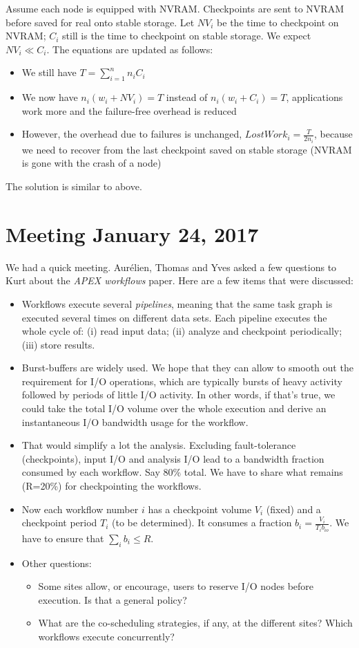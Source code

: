 \documentclass{article}
\begin{document}
Assume each node is equipped with NVRAM. Checkpoints are sent to NVRAM before
saved for real onto stable storage. Let $NV_{i}$ be the time to checkpoint on NVRAM; $C_{i}$
still is the time to checkpoint on stable storage. We expect $NV_{i} \ll C_{i}$.
The equations are updated as follows:
\begin{itemize}
\item We still have $T  = \sum_{i=1}^{n} n_{i} C_{i}$
\item  We now have $n_{i} (w_{i}+NV_{i})=T$ instead of $n_{i} (w_{i}+C_{i})=T$, applications work more and the failure-free overhead is reduced
\item However, the overhead due to failures is unchanged, $LostWork_{i} = \frac{T}{2n_{i}}$, 
because we need to recover from the last checkpoint saved on stable storage (NVRAM is gone with the crash of a node)
\end{itemize}
The solution is similar to above.

\clearpage
\section{Meeting January 24, 2017}

We had a quick meeting. Aurélien, Thomas and Yves asked a few questions to Kurt 
about the \emph{APEX workflows} paper. Here are a few items that were discussed:
\begin{itemize}
\item Workflows execute several \emph{pipelines}, meaning that the same task graph
is executed several times on different data sets. Each pipeline executes the whole
cycle of: (i) read input data; (ii) analyze and checkpoint periodically; (iii) store results.
\item Burst-buffers are widely used. We hope that they can allow to smooth out the requirement for
I/O operations, which are typically bursts of heavy activity followed by periods of little I/O
activity. In other words, if that's true, we could take the total I/O volume over the whole execution and derive an instantaneous I/O bandwidth usage for the workflow. 
\item That would simplify a lot the analysis.
Excluding fault-tolerance (checkpoints), input I/O and analysis I/O lead to a bandwidth fraction consumed by each workflow. Say 80\% total. We have to share what remains
(R=20\%)  for checkpointing the workflows. 
\item Now each workflow number $i$ has a checkpoint volume $V_{i}$ (fixed) and a checkpoint period $T_{i}$ (to be determined). It consumes 
a fraction $b_{i} = \frac{V_{i}}{T_{i} b_{io}}$. 
We have to ensure that $\sum_{i} b_{i} \leq R$.
\item Other questions:
\begin{itemize}
\item  Some sites allow, or encourage, users to reserve I/O nodes before execution.
Is that a general policy?
\item What are the co-scheduling strategies, if any, at the different sites? 
Which workflows execute concurrently?
\end{itemize}

\end{itemize}
\end{document}
